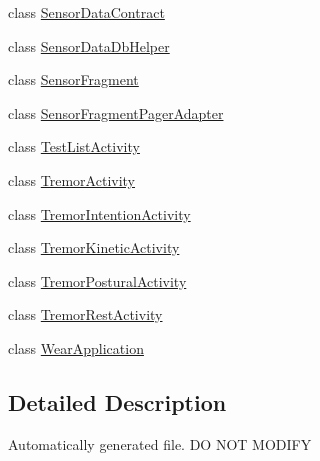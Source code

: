 \begin{DoxyCompactItemize}
class \hyperlink{classcom_1_1example_1_1android_1_1wearable_1_1wcldemo_1_1SensorDataContract}{Sensor\+Data\+Contract}
\item 
class \hyperlink{classcom_1_1example_1_1android_1_1wearable_1_1wcldemo_1_1SensorDataDbHelper}{Sensor\+Data\+Db\+Helper}
\item 
class \hyperlink{classcom_1_1example_1_1android_1_1wearable_1_1wcldemo_1_1SensorFragment}{Sensor\+Fragment}
\item 
class \hyperlink{classcom_1_1example_1_1android_1_1wearable_1_1wcldemo_1_1SensorFragmentPagerAdapter}{Sensor\+Fragment\+Pager\+Adapter}
\item 
class \hyperlink{classcom_1_1example_1_1android_1_1wearable_1_1wcldemo_1_1TestListActivity}{Test\+List\+Activity}
\item 
class \hyperlink{classcom_1_1example_1_1android_1_1wearable_1_1wcldemo_1_1TremorActivity}{Tremor\+Activity}
\item 
class \hyperlink{classcom_1_1example_1_1android_1_1wearable_1_1wcldemo_1_1TremorIntentionActivity}{Tremor\+Intention\+Activity}
\item 
class \hyperlink{classcom_1_1example_1_1android_1_1wearable_1_1wcldemo_1_1TremorKineticActivity}{Tremor\+Kinetic\+Activity}
\item 
class \hyperlink{classcom_1_1example_1_1android_1_1wearable_1_1wcldemo_1_1TremorPosturalActivity}{Tremor\+Postural\+Activity}
\item 
class \hyperlink{classcom_1_1example_1_1android_1_1wearable_1_1wcldemo_1_1TremorRestActivity}{Tremor\+Rest\+Activity}
\item 
class \hyperlink{classcom_1_1example_1_1android_1_1wearable_1_1wcldemo_1_1WearApplication}{Wear\+Application}
\end{DoxyCompactItemize}


\subsection{Detailed Description}
Automatically generated file. DO N\+OT M\+O\+D\+I\+FY 
